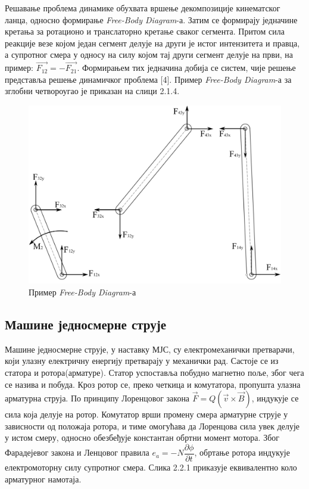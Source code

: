 \documentclass[12pt]{article}
\begin{document}
Решавање проблема динамике обухвата вршење декомпозиције кинематског ланца, односно формирање \textit{Free-Body Diagram}-а. Затим се формирају једначине кретања за ротационо и транслаторно кретање сваког сегмента. Притом сила реакције везе којом један сегмент делује на други је истог интензитета и правца, а супротног смера у односу на силу којом тај други сегмент делује на први, на пример: $\vec{F_{12}} = -\vec{F_{21}}$. Формирањем тих једначина добија се систем, чије решење представља решење динамичког проблема [4]. Пример \textit{Free-Body Diagram}-а за зглобни четвороугао је приказан на слици 2.1.4.

\begin{figure}[H]
    \centering
    \includegraphics[width=12cm]{figures/4bar_fbd.jpg}
    \caption{Пример \textit{Free-Body Diagram}-а}
    \label{fig:фбд_пример}
\end{figure}

\subsection{Машине једносмерне струје}
Машине једносмерне струје, у наставку МЈС, су електромеханички претварачи, који улазну електричну енергију претварају у механички рад. Састоје се из статора и ротора(арматуре). Статор успоставља побудно магнетно поље, због чега се назива и побуда. Кроз ротор се, преко четкица и комутатора, пропушта улазна арматурна струја. По принципу Лоренцовог закона $\vec F=Q(\vec v \times \vec B)$, индукује се сила која делује на ротор. Комутатор врши промену смера арматурне струје у зависности од положаја ротора, и тиме омогућава да Лоренцова сила увек делује у истом смеру, односно обезбеђује константан обртни момент мотора. Због Фарадејевог закона и Ленцовог правила $e_a=-N\dfrac{\partial\phi }{\partial t}$, обртање ротора индукује електромоторну силу супротног смера. Слика 2.2.1 приказује еквивалентно коло арматурног намотаја.
\end{document}
